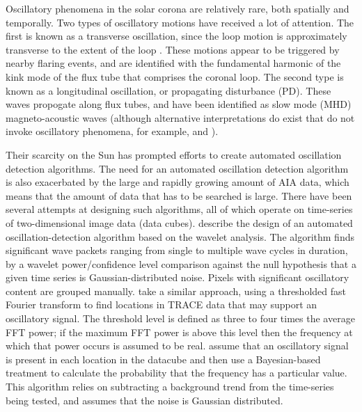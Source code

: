 \documentclass[onecolumn]{emulateapj}
\begin{document}
Oscillatory phenomena in the solar corona are relatively rare, both
spatially and temporally.  Two types of oscillatory motions have
received a lot of attention.  The first is known as a transverse
oscillation, since the loop motion is approximately transverse to the
extent of the loop \citep{1999Sci...285..862N}.  These motions appear
to be triggered by nearby flaring events, and are identified with the
fundamental harmonic of the kink mode of the flux tube that comprises
the coronal loop.  The second type is known as a longitudinal
oscillation, or propagating disturbance (PD).  These waves propogate
along flux tubes, and have been identified as slow mode (MHD)
magneto-acoustic waves (although alternative interpretations do exist
that do not invoke oscillatory phenomena, for example,
\cite{0004-637X-722-2-1013} and \cite{2041-8205-727-2-L37}).

Their scarcity on the Sun has prompted efforts to create automated
oscillation detection algorithms.  The need for an automated
oscillation detection algorithm is also exacerbated by the large and
rapidly growing amount of AIA data, which means that the amount of
data that has to be searched is large.  There have been several
attempts at designing such algorithms, all of which operate on
time-series of two-dimensional image data (data cubes).
\cite{2004SoPh..223....1D} describe the design of an automated
oscillation-detection algorithm based on the wavelet analysis. The
algorithm finds significant wave packets ranging from single to
multiple wave cycles in duration, by a wavelet power/confidence level
comparison against the null hypothesis that a given time series is
Gaussian-distributed noise.  Pixels with significant oscillatory
content are grouped manually.  \cite{2007SoPh..241..397N} take a
similar approach, using a thresholded fast Fourier transform to find
locations in TRACE data that may support an oscillatory signal. The
threshold level is defined as three to four times the average FFT
power; if the maximum FFT power is above this level then the frequency
at which that power occurs is assumed to be real.
\cite{2010SoPh..264..403I} assume that an oscillatory signal is
present in each location in the datacube and then use a Bayesian-based
treatment to calculate the probability that the frequency has a
particular value.  This algorithm relies on subtracting a background
trend from the time-series being tested, and assumes that the noise is
Gaussian distributed.
\end{document}
